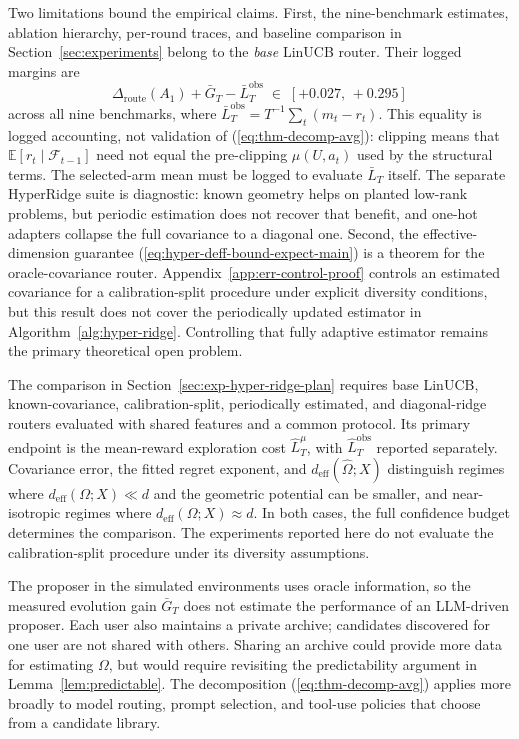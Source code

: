 \documentclass{article} %
\renewcommand{\eqref}[1]{\textup{(\ref{#1})}}
\begin{document}
Two limitations bound the empirical claims. First, the nine-benchmark estimates, ablation hierarchy, per-round traces, and baseline comparison in Section~\ref{sec:experiments} belong to the \emph{base} LinUCB router. Their logged margins are
\begin{equation}
\label{eq:conc-margins}
\Delta_{\mathrm{route}}(A_1) + \bar G_T - \bar L_T^{\mathrm{obs}}
\;\in\; [+0.027,\, +0.295]
\end{equation}
across all nine benchmarks, where
\(\bar L_T^{\mathrm{obs}}=T^{-1}\sum_t(m_t-r_t)\). This equality is logged
accounting, not validation of \eqref{eq:thm-decomp-avg}: clipping means that
\(\mathbb E[r_t\mid\mathcal F_{t-1}]\) need not equal the pre-clipping
\(\mu(U,a_t)\) used by the structural terms. The selected-arm mean must be
logged to evaluate \(\bar L_T\) itself. The separate HyperRidge suite is
diagnostic: known geometry helps on planted low-rank problems, but periodic
estimation does not recover that benefit, and one-hot adapters collapse the
full covariance to a diagonal one. Second, the effective-dimension guarantee
\eqref{eq:hyper-deff-bound-expect-main} is a theorem for the oracle-covariance router.
Appendix~\ref{app:err-control-proof} controls an estimated covariance for a
calibration-split procedure under explicit diversity conditions, but this
result does not cover the periodically updated estimator in
Algorithm~\ref{alg:hyper-ridge}. Controlling that fully adaptive estimator
remains the primary theoretical open problem.

The comparison in Section~\ref{sec:exp-hyper-ridge-plan} requires base LinUCB, known-covariance, calibration-split, periodically estimated, and diagonal-ridge routers evaluated with shared features and a common protocol. Its primary endpoint is the mean-reward exploration cost $\widehat L_T^\mu$, with $\widehat L_T^{\mathrm{obs}}$ reported separately. Covariance error, the fitted regret exponent, and $d_{\mathrm{eff}}(\widehat\Omega;X)$ distinguish regimes where
$d_{\mathrm{eff}}(\Omega;X)\ll d$ and the geometric potential can be smaller,
and near-isotropic regimes where $d_{\mathrm{eff}}(\Omega;X)\approx d$. In both cases, the full confidence
budget determines the comparison. The experiments reported here do not
evaluate the calibration-split procedure under its diversity assumptions.

The proposer in the simulated environments uses oracle information, so the measured evolution gain $\bar G_T$ does not estimate the performance of an LLM-driven proposer. Each user also maintains a private archive; candidates discovered for one user are not shared with others. Sharing an archive could provide more data for estimating \(\Omega\), but would require revisiting the predictability argument in Lemma~\ref{lem:predictable}. The decomposition \eqref{eq:thm-decomp-avg} applies more broadly to model routing, prompt selection, and tool-use policies that choose from a candidate library.
\end{document}
